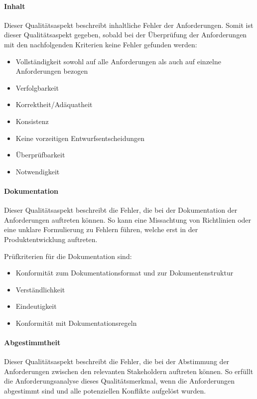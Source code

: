 \paragraph{Inhalt}
Dieser Qualitätsaspekt beschreibt inhaltliche Fehler der Anforderungen.
Somit ist dieser Qualitätsaspekt gegeben, sobald bei der Überprüfung der Anforderungen mit den nachfolgenden Kriterien keine Fehler gefunden werden:
\begin{itemize}
    \item Vollständigkeit sowohl auf alle Anforderungen als auch auf einzelne Anforderungen bezogen
    \item Verfolgbarkeit
    \item Korrektheit/Adäquatheit
    \item Konsistenz
    \item Keine vorzeitigen Entwurfsentscheidungen
    \item Überprüfbarkeit
    \item Notwendigkeit
\end{itemize}\autocite[vgl.][Seite 19f]{Maulhardt.c}

\paragraph{Dokumentation}
Dieser Qualitätsaspekt beschreibt die Fehler, die bei der Dokumentation der Anforderungen auftreten können.
So kann eine Missachtung von Richtlinien oder eine unklare Formulierung zu Fehlern führen, welche erst in der Produktentwicklung auftreten.

Prüfkriterien für die Dokumentation sind:
\begin{itemize}
    \item Konformität zum Dokumentationsformat und zur Dokumentenstruktur
    \item Verständlichkeit
    \item Eindeutigkeit
    \item Konformität mit Dokumentationsregeln
\end{itemize}\autocite[vgl.][Seite 21ff]{Maulhardt.c}

\paragraph{Abgestimmtheit}
Dieser Qualitätsaspekt beschreibt die Fehler, die bei der Abstimmung der Anforderungen zwischen den relevanten Stakeholdern auftreten können.
So erfüllt die Anforderungsanalyse dieses Qualitätsmerkmal, wenn die Anforderungen abgestimmt sind und alle potenziellen Konflikte aufgelöst wurden\autocite[vgl.][Seite 24]{Maulhardt.c}.

